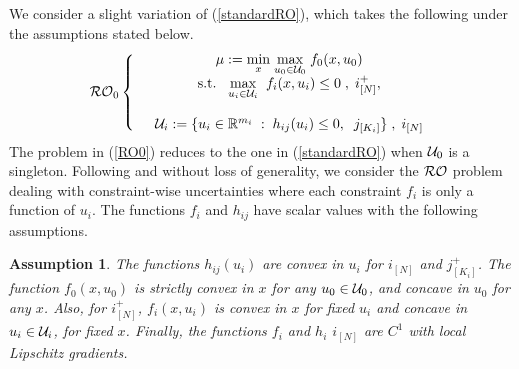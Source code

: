 \documentclass[journal,twoside,web]{ieeecolor}
\newtheorem{assumption}[theorem]{Assumption}
\begin{document}
We consider a slight variation of (\ref{standardRO}), which takes the following under the assumptions stated below.  
\begin{equation}\label{RO0}
\mathcal{RO}_0\left\{ \begin{array}{ccc}
&\mu:=\underset{x}{\min} \;\underset{u_0\in {\cal U}_0}{\max}\; f_0(x,u_0)\\
&\text{s.t.}\;\;\;\underset{u_i\in {\cal U}_i}{\max}\;\; f_i(x,u_i)\leq 0\;,\;i^+_{[N]},\\ \\
&{\cal U}_i:=\{u_ i\in \mathbb{R}^{m_i}\;:\;h_{ij}(u_i)\leq 0,\;\;j_{[K_i]}\}\;,\;i_{[N]}
\end{array}\right.
\end{equation}
The problem in (\ref{RO0}) reduces to the one in (\ref{standardRO}) when ${\cal U}_0$ is a singleton.
Following \cite{bental2009-2} and without loss of generality, we consider the ${\cal RO}$ problem dealing with constraint-wise uncertainties where each constraint $f_i$ is only a function of $u_i$.
The functions $f_i$ and $h_{ij}$ have scalar values with the following assumptions.

\begin{assumption}\label{assume1} The functions $h_{ij}(u_i)$ are convex in $u_i$ for $i_{[N]}$ and $j^+_{[K_i]}$. 
The function $f_0(x,u_0)$ is strictly convex in $x$ for any $u_0\in {\cal U}_0$, and concave in $u_0$ for any $x$. Also, for $i^+_{[N]}$, $f_i(x,u_i)$ is convex in $x$ for fixed $u_i$ and concave in $u_i\in {\cal U}_i$, for fixed $x$. %
Finally, the functions $f_i$ and $h_i$ $i_{[N]}$ are $C^1$ with local Lipschitz gradients.%
\end{assumption}
\end{document}
